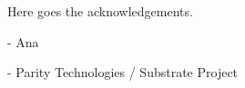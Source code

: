 \begin{acknowledgements}      %

Here goes the acknowledgements.

- Ana

- Parity Technologies / Substrate Project

\end{acknowledgements}
